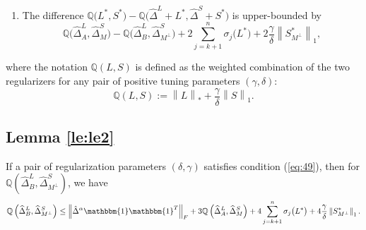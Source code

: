 \documentclass[AMS,STIX1COL]{WileyNJD-v2}
\begin{document}
{\begin{lemma}
\begin{enumerate}
\begin{equation}
    \end{equation}
 \item The difference $\mathbb{Q}\big(L^{*},S^{*}\big) -  \mathbb{Q}\big(\widehat{\Delta}^L + L^{*},\widehat{\Delta}^S + S^{*}\big)$ is upper-bounded by
    \begin{equation} \label{eq:28}
        \mathbb{Q}\big(\widehat{\Delta}^L_{A},\widehat{\Delta}^S_{M}\big) - \mathbb{Q}\big(\widehat{\Delta}^L_{B},\widehat{\Delta}^S_{M^\perp}\big)
        +2 \sum_{j=k+1}^{n} \sigma_{j}\big(L^*\big) + 2\frac{\gamma}{\delta}\left\|S^*_{M^\perp}\right\|_{1},
    \end{equation}
\end{enumerate}
\end{lemma}
where the notation $\mathbb{Q}(L,S)$ is defined as the weighted combination of the two regularizers for any pair of positive tuning parameters $(\gamma,\delta)$:
\[
\mathbb{Q}\left(L,S\right)   := \left\|L\right\|_{*} + \frac{\gamma}{\delta}\left\|S\right\|_1.
\]

\subsection{Lemma \ref{le:le2}} \label{App:Lemma2}
\begin{lemma} \label{le:le2}
If a pair of regularization parameters $(\delta,\gamma)$ satisfies condition (\ref{eq:49}), then for $\mathbb{Q}\left(\widehat{\Delta}^L_{B},\widehat{\Delta}^S_{M^\perp}\right)$, we have
\[
    \mathbb{Q}\left(\widehat{\Delta}^L_{B},\widehat{\Delta}^S_{M^\perp}\right) \leq
    \left\|\hat{\Delta}^{\alpha}\mathbbm{1}\mathbbm{1}^T\right\|_{F} +
    3\mathbb{Q}\left(\widehat{\Delta}^{L}_{A},\widehat{\Delta}^{S}_{M}\right)+4 \sum_{j=k+1}^{n} \sigma_{j}\big(L^{*}\big) + 4\frac{\gamma}{\delta}
    \left\|S^{*}_{M^\perp}\right\|_{1}.
\]
\end{lemma}

}
\end{document}
